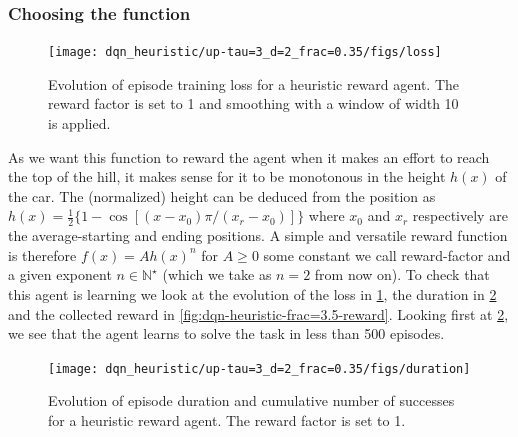 \documentclass[a4paper, 12pt,oneside]{article}
\begin{document}
        \subsubsection{Choosing the function}
        \begin{figure}
            \centering
            \vspace{-6em}
            \texttt{[image: dqn\_heuristic/up-tau=3\_d=2\_frac=0.35/figs/loss]}
            \caption{Evolution of episode training loss for a heuristic reward agent. The reward factor is set to 1 and smoothing with a window of width 10 is applied.}
            \label{fig:dqn-heuristic-frac=3.5-loss}
        \end{figure}
        As we want this function to reward the agent when it makes an effort to reach the top of the hill, it makes sense for it to be monotonous in the height $h(x)$ of the car. The (normalized) height can be deduced from the position as $h(x) = \frac{1}{2}\{1-\cos[(x-x_0)\pi/(x_r-x_0)]\}$ where $x_0$ and $x_r$ respectively are the average-starting and ending positions. 
        A simple and versatile reward function is therefore $f(x) = Ah(x)^n$
        for $A\ge 0$ some constant we call reward-factor and a given exponent $n\in\mathbb N^\star$ (which we take as $n=2$ from now on). 
        To check that this agent is learning we look at the evolution of the loss in \ref{fig:dqn-heuristic-frac=3.5-loss}, the duration in \ref{fig:dqn-heuristic-frac=3.5-duration} and the collected reward in \ref{fig:dqn-heuristic-frac=3.5-reward}. Looking first at \ref{fig:dqn-heuristic-frac=3.5-duration}, we see that the agent learns to  solve the task in less than 500 episodes. 
        \begin{figure}[h!]
            \centering
            \vspace{0em}
            \texttt{[image: dqn\_heuristic/up-tau=3\_d=2\_frac=0.35/figs/duration]}
            \caption{Evolution of episode duration and cumulative number of successes for a heuristic reward agent. The reward factor is set to 1.}
            \label{fig:dqn-heuristic-frac=3.5-duration}
        \end{figure}
\end{document}

